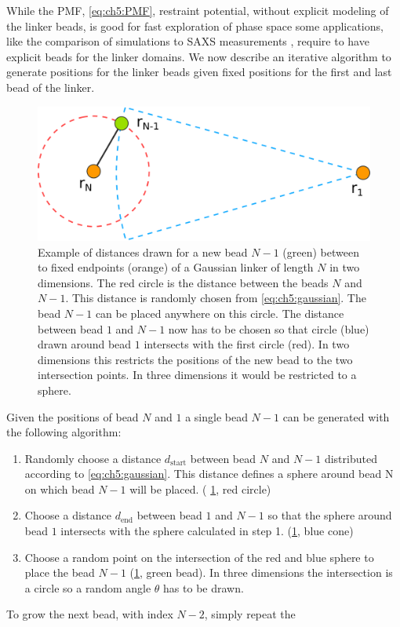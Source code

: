 \documentclass[12pt, twoside]{report}
\begin{document}
While the PMF, \cref{eq:ch5:PMF}, restraint potential, without explicit modeling
of the linker beads, is good for fast exploration of phase space some
applications, like the comparison of simulations to \gls{SAXS} measurements
\cite{Kofinger2015, Rozycki2011}, require to have explicit beads for the linker
domains. We now describe an iterative algorithm to generate positions for the
linker beads given fixed positions for the first and last bead of the linker.
\begin{figure}[!ht]
  \centering
\includegraphics[width=\linewidth]{figures/gaussian_chain_move}
\caption[Illustration of generating bead distances for a Gaussian polymer
model.]{Example of distances drawn for a new bead $N-1$ (green) between to fixed
  endpoints (orange) of a Gaussian linker of length $N$ in two dimensions. The
  red circle is the distance between the beads $N$ and $N - 1$. This distance is
  randomly chosen from \cref{eq:ch5:gaussian}. The bead $N-1$ can be placed
  anywhere on this circle. The distance between bead $1$ and $N-1$ now has to be
  chosen so that circle (blue) drawn around bead $1$ intersects with the first
  circle (red). In two dimensions this restricts the positions of the new bead
  to the two intersection points. In three dimensions it would be restricted to
  a sphere. }
\label{fig:algorithm}
\end{figure} Given the positions of bead $N$ and $1$ a single bead $N-1$ can be
generated with the following algorithm:
\begin{enumerate}
\item Randomly choose a distance \(d_{\mathrm{start}}\) between bead $N$ and
$N-1$ distributed according to \cref{eq:ch5:gaussian}. This distance defines a
sphere around bead N on which bead \(N-1\) will be placed. (
\cref{fig:algorithm}, red circle)
\item Choose a distance \(d_{\mathrm{end}}\) between bead $1$ and $N-1$ so that
the sphere around bead $1$ intersects with the sphere calculated in step 1.
(\cref{fig:algorithm}, blue cone)
\item Choose a random point on the intersection of the red and blue sphere to
place the bead \(N-1\) (\cref{fig:algorithm}, green bead). In three dimensions
the intersection is a circle so a random angle $\theta$ has to be drawn.
\end{enumerate} To grow the next bead, with index $N-2$, simply repeat the
\end{document}
